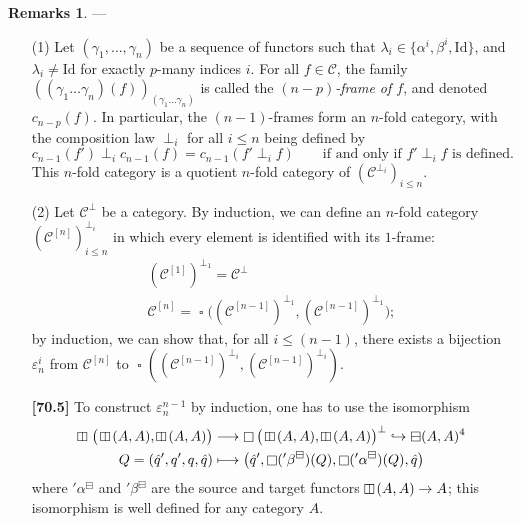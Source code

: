 \documentclass[a4paper,fleqn]{article}
\theoremstyle{plain}
\theoremstyle{definition}
\newtheorem*{remarks}{Remarks}
\newenvironment{longcomm}[1]
  {\noindent\textbf{[#1]}\rmfamily}
  {}
\renewcommand{\leq}{\leqslant}
\newcommand{\CC}{\mathcal{C}}
\newcommand{\Id}{\mathrm{Id}}
\newcommand{\hsqbox}{{\boxminus}}
\newcommand{\vsqbox}{{\rotatebox{90}{$\boxminus$}}}
\DeclareMathOperator{\sq}{\square}
\DeclareMathOperator{\hsq}{\raisebox{-.05em}{$\hsqbox$}}
\DeclareMathOperator{\vsq}{\raisebox{-.1em}{$\vsqbox$\,}}
\begin{document}
\begin{remarks}
  ---
  \begin{enumerate}
    \item[\normalfont(1)]
      Let $(\gamma_1,\ldots,\gamma_n)$ be a sequence of functors such that $\lambda_i\in\{\alpha^i,\beta^i,\Id\}$, and $\lambda_i\neq\Id$ for exactly $p$-many indices $i$.
      For all $f\in\CC$, the family $((\gamma_1\ldots\gamma_n)(f))_{(\gamma_1\ldots\gamma_n)}$ is called the \emph{$(n-p)$-frame of $f$}, and denoted $c_{n-p}(f)$.
      In particular, the $(n-1)$-frames form an $n$-fold category, with the composition law $\perp_i$ for all $i\leq n$ being defined by
      \[
        c_{n-1}(f')\perp_i c_{n-1}(f)
        = c_{n-1}(f'\perp_i f)
        \qquad\text{if and only if $f'\perp_i f$ is defined.}
      \]
      This $n$-fold category is a quotient $n$-fold category of $(\CC^{\perp_i})_{i\leq n}$.

    \item[\normalfont(2)]
      Let $\CC^\perp$ be a category.
      By induction, we can define an $n$-fold category $(\CC^{[n]})_{i\leq n}^{\perp_i}$ in which every element is identified with its $1$-frame:
      \[
        \begin{gathered}
          (\CC^{[1]})^{\perp_1}
          = \CC^\perp
        \\\CC^{[n]}
          = \sq\big(
            (\CC^{[n-1]})^{\perp_1}, (\CC^{[n-1]})^{\perp_1}
          \big);
        \end{gathered}
      \]
      by induction, we can show that, for all $i\leq(n-1)$, there exists a bijection $\varepsilon_n^i$ from $\CC^{[n]}$ to $\sq((\CC^{[n-1]})^{\perp_i},(\CC^{[n-1]})^{\perp_i})$.

      \begin{longcomm}{70.5}
        To construct $\varepsilon_n^{n-1}$ by induction, one has to use the isomorphism
        \[
          \begin{aligned}
            \vsq\big(\vsq(A,A),\vsq(A,A)\big)
            &\longrightarrow
            \sq\big(\vsq(A,A),\vsq(A,A)\big)^\perp
            \hookrightarrow \hsq(A,A)^4
          \\Q=(\hat{q}',q',q,\hat{q})
            &\longmapsto
            \big(
              \hat{q}',
              \sq({}'\beta^\hsqbox)(Q),
              \sq({}'\alpha^\hsqbox)(Q),
              \hat{q}
            \big)
          \end{aligned}
        \]
        where ${}'\alpha^\hsqbox$ and ${}'\beta^\hsqbox$ are the source and target functors $\vsq(A,A)\to A$;
        this isomorphism is well defined for any category $A$.


\end{longcomm}
\end{enumerate}
\end{remarks}
\end{document}
